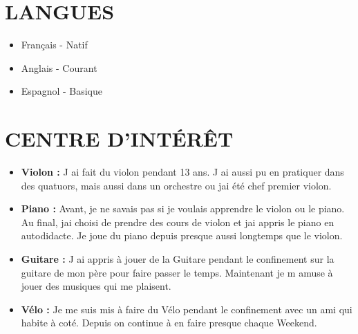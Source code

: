 \documentclass[letterpaper,11pt]{article}
\makeatletter
\newcommand{\resumeItem}[1]{  \item\small{    { #1 \vspace{-1pt}}  }}\newcommand{\classesList}[4]{    \item\small{        { #1 #2 #3 #4 \vspace{-2pt}}  }}\newcommand{\resumeSubheading}[4]{  \vspace{-2pt}\item    \begin{tabular*}{1.0\textwidth}[t]{l@{\extracolsep{\fill}}r}      \textbf{\large #1} & \textbf{\small #2} \\      \textit{\large #3} & \textit{\small #4} \\          \end{tabular*}\vspace{-7pt}}\newcommand{\resumeSingleSubheading}[4]{  \vspace{-2pt}\item    \begin{tabular*}{1.0\textwidth}[t]{l@{\extracolsep{\fill}}r}      \textbf{\large #1} & \textbf{\small #2} \\          \end{tabular*}\vspace{-7pt}}\newcommand{\resumeSubSubheading}[2]{    \item    \begin{tabular*}{0.97\textwidth}{l@{\extracolsep{\fill}}r}      \textit{\small #1} & \textit{\small #2} \\    \end{tabular*}\vspace{-7pt}}\newcommand{\resumeProjectHeading}[2]{    \item    \begin{tabular*}{1.001\textwidth}{l@{\extracolsep{\fill}}r}      \small #1 & \textbf{\small #2}\\    \end{tabular*}\vspace{-7pt}}\newcommand{\resumeSubItem}[1]{\resumeItem{ #1}\vspace{-4pt}}\renewcommand\labelitemi{$\vcenter{\hbox{\tiny$\bullet$}}$}\renewcommand\labelitemii{$\vcenter{\hbox{\tiny$\bullet$}}$}\newcommand{\resumeSubHeadingListStart}{\begin{itemize}[leftmargin=0.0in, label={}]}\newcommand{\resumeSubHeadingListEnd}{\end{itemize}}\newcommand{\resumeItemListStart}{\begin{itemize}[leftmargin=0.1in]}\newcommand{\resumeItemListEnd}{\end{itemize}\vspace{-5pt}}\newcommand\sbullet[1][.5]{\mathbin{\vcenter{\hbox{\scalebox{ #1}{$\bullet$}}}}}
\makeatother
\begin{document}
\vspace{-8pt}

\section{\color{airforceblue}LANGUES}
  \resumeItemListStart
    
      \resumeItem{ \normalsize{ Français - Natif } }
      \vspace{-5pt}
    
      \resumeItem{ \normalsize{ Anglais - Courant } }
      \vspace{-5pt}
    
      \resumeItem{ \normalsize{ Espagnol - Basique } }
      \vspace{-5pt}
    
  \resumeItemListEnd     
  \vspace{-8pt}

\section{\color{airforceblue}CENTRE D'INTÉRÊT}
    
      \resumeItemListStart
        
          \resumeItem{\normalsize{\textbf{ Violon :} J ai fait du violon pendant 13 ans. J ai aussi pu en pratiquer dans des quatuors, mais aussi dans un orchestre ou jai été chef premier violon. }}
          \vspace{-5pt}
        
          \resumeItem{\normalsize{\textbf{ Piano :} Avant, je ne savais pas si je voulais apprendre le violon ou le piano. Au final, jai choisi de prendre des cours de violon et jai appris le piano en autodidacte. Je joue du piano depuis presque aussi longtemps que le violon. }}
          \vspace{-5pt}
        
          \resumeItem{\normalsize{\textbf{ Guitare :} J ai appris à jouer de la Guitare pendant le confinement sur la guitare de mon père pour faire passer le temps. Maintenant je m amuse à jouer des musiques qui me plaisent. }}
          \vspace{-5pt}
        
          \resumeItem{\normalsize{\textbf{ Vélo :} Je me suis mis à faire du Vélo pendant le confinement avec un ami qui habite à coté. Depuis on continue à en faire presque chaque Weekend. }}
          \vspace{-5pt}
        
      \resumeItemListEnd 
      
\vspace{-12pt}
\end{document}
